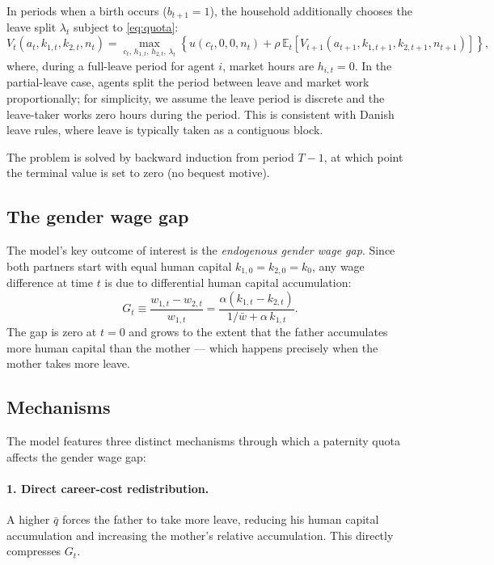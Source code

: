In periods when a birth occurs ($b_{t+1} = 1$), the household additionally chooses the leave split $\lambda_t$ subject to \eqref{eq:quota}:
\begin{equation}
    V_t(a_t, k_{1,t}, k_{2,t}, n_t) = \max_{c_t,\, h_{1,t},\, h_{2,t},\, \lambda_t} \left\{ u(c_t, 0, 0, n_t) + \rho\,\mathbb{E}_t\!\left[V_{t+1}(a_{t+1}, k_{1,t+1}, k_{2,t+1}, n_{t+1})\right]\right\},
    \label{eq:bellman_b}
\end{equation}
where, during a full-leave period for agent $i$, market hours are $h_{i,t} = 0$. In the partial-leave case, agents split the period between leave and market work proportionally; for simplicity, we assume the leave period is discrete and the leave-taker works zero hours during the period. This is consistent with Danish leave rules, where leave is typically taken as a contiguous block.

The problem is solved by backward induction from period $T-1$, at which point the terminal value is set to zero (no bequest motive).

\subsection{The gender wage gap}

The model's key outcome of interest is the \textit{endogenous gender wage gap}. Since both partners start with equal human capital $k_{1,0} = k_{2,0} = k_0$, any wage difference at time $t$ is due to differential human capital accumulation:
\begin{equation}
    G_t \equiv \frac{w_{1,t} - w_{2,t}}{w_{1,t}} = \frac{\alpha(k_{1,t} - k_{2,t})}{1/\bar{w} + \alpha\, k_{1,t}}.
    \label{eq:gap}
\end{equation}
The gap is zero at $t=0$ and grows to the extent that the father accumulates more human capital than the mother --- which happens precisely when the mother takes more leave.

\subsection{Mechanisms}

The model features three distinct mechanisms through which a paternity quota affects the gender wage gap:

\paragraph{1. Direct career-cost redistribution.}
A higher $\bar{q}$ forces the father to take more leave, reducing his human capital accumulation and increasing the mother's relative accumulation. This directly compresses $G_t$.

